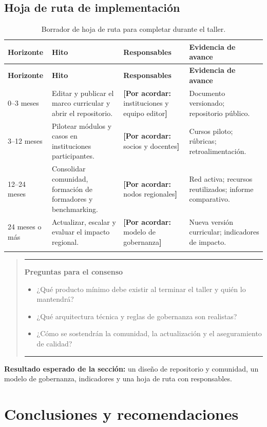 \documentclass[11pt,a4paper]{article}
\newcommand{\pendiente}[1]{\textcolor{azulieb}{\textbf{[Por acordar:} #1\textbf{]}}}
\newenvironment{preguntas}
  {\par\medskip\begin{quote}\color{azulieb}\hrule\smallskip
   \textbf{Preguntas para el consenso}\par\smallskip\begin{itemize}}
  {\end{itemize}\smallskip\hrule\end{quote}\par\medskip}
\begin{document}
\subsection{Hoja de ruta de implementación}

\begin{longtable}{@{}p{2.7cm}p{4.2cm}p{3.4cm}p{3.4cm}@{}}
\toprule
\textbf{Horizonte} & \textbf{Hito} & \textbf{Responsables} &
\textbf{Evidencia de avance}\\
\midrule
\endfirsthead
\toprule
\textbf{Horizonte} & \textbf{Hito} & \textbf{Responsables} &
\textbf{Evidencia de avance}\\
\midrule
\endhead
0--3 meses &
Editar y publicar el marco curricular y abrir el repositorio. &
\pendiente{instituciones y equipo editor} &
Documento versionado; repositorio público.\\
3--12 meses &
Pilotear módulos y casos en instituciones participantes. &
\pendiente{socios y docentes} &
Cursos piloto; rúbricas; retroalimentación.\\
12--24 meses &
Consolidar comunidad, formación de formadores y benchmarking. &
\pendiente{nodos regionales} &
Red activa; recursos reutilizados; informe comparativo.\\
24 meses o más &
Actualizar, escalar y evaluar el impacto regional. &
\pendiente{modelo de gobernanza} &
Nueva versión curricular; indicadores de impacto.\\
\bottomrule
\caption{Borrador de hoja de ruta para completar durante el taller.}
\end{longtable}

\begin{preguntas}
  \item ¿Qué producto mínimo debe existir al terminar el taller y quién lo
  mantendrá?
  \item ¿Qué arquitectura técnica y reglas de gobernanza son realistas?
  \item ¿Cómo se sostendrán la comunidad, la actualización y el aseguramiento de
  calidad?
\end{preguntas}

\noindent\textbf{Resultado esperado de la sección:}
un diseño de repositorio y comunidad, un modelo de gobernanza, indicadores y una
hoja de ruta con responsables.

\section{Conclusiones y recomendaciones}
\end{document}
